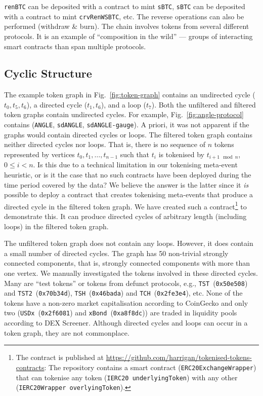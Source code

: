\texttt{renBTC} can be deposited with a contract to mint
\texttt{sBTC}, \texttt{sBTC} can be deposited with a contract to mint
\texttt{crvRenWSBTC}, etc.  The reverse operations can also be
performed (withdraw \& burn).  The chain involves tokens from several
different protocols.  It is an example of ``composition in the wild''
--- groups of interacting smart contracts than span multiple
protocols.

\subsection{Cyclic Structure}\label{sec:analysis-cyclic-structure}

The example token graph in Fig.~\ref{fig:token-graph} contains an
undirected cycle ($t_0, t_5, t_6$), a directed cycle ($t_1, t_6$), and
a loop ($t_7$).  Both the unfiltered and filtered token graphs contain
undirected cycles.  For example, Fig.~\ref{fig:angle-protocol}
contains (\texttt{ANGLE}, \texttt{sdANGLE}, \texttt{sdANGLE-gauge}).
A priori, it was not apparent if the graphs would contain directed
cycles or loops.  The filtered token graph contains neither directed
cycles nor loops.  That is, there is no sequence of $n$ tokens
represented by vertices $t_0, t_1, \ldots, t_{n - 1}$ such that $t_i$
is tokenised by $t_{i + 1 \mod n}$, $0 \le i < n$.  Is this due to a
technical limitation in our tokenising meta-event heuristic, or is it
the case that no such contracts have been deployed during the time
period covered by the data?  We believe the answer is the latter since
it \textit{is} possible to deploy a contract that creates tokenising
meta-events that produce a directed cycle in the filtered token graph.
We have created such a contract\footnote{The contract is published at
\url{https://github.com/harrigan/tokenised-tokens-contracts}: The
repository contains a smart contract (\texttt{ERC20ExchangeWrapper})
that can tokenise any token (\texttt{IERC20 underlyingToken}) with any
other (\texttt{IERC20Wrapper overlyingToken}).} to demonstrate this.
It can produce directed cycles of arbitrary length (including loops)
in the filtered token graph.

The unfiltered token graph does not contain any loops.  However, it
does contain a small number of directed cycles.  The graph has
\num{50} non-trivial strongly connected components, that is, strongly
connected components with more than one vertex.  We manually
investigated the tokens involved in these directed cycles.  Many are
``test tokens'' or tokens from defunct protocols, e.g.,
\texttt{TST}~(\texttt{0x50e508}) and
\texttt{TST2}~(\texttt{0x70b34d}), \texttt{TSH}~(\texttt{0x46bada})
and \texttt{TCH}~(\texttt{0x2fe3e4}), etc.  None of the tokens have a
non-zero market capitalisation according to CoinGecko and only two
(\texttt{USDx}~(\texttt{0x2f6081}) and
\texttt{xBond}~(\texttt{0xa8f8dc})) are traded in liquidity pools
according to DEX Screener.  Although directed cycles and loops can
occur in a token graph, they are not commonplace.
